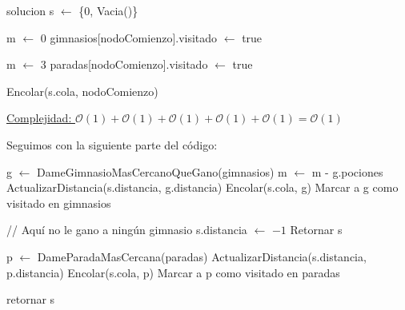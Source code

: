 \begin{algorithm}[H]
\label{}
\begin{algorithmic}[]

\State solucion s $\leftarrow$ \{0, Vacia()\} 

 

	\State m $\leftarrow$ 0  
	\State gimnasios[nodoComienzo].visitado $\leftarrow$ true 
\Else

	\State m $\leftarrow$ 3  
	\State paradas[nodoComienzo].visitado $\leftarrow$ true 

\EndIf

\State Encolar(s.cola, nodoComienzo) 

\medskip
\Statex \underline{Complejidad: $\mathcal{O}(1) + \mathcal{O}(1) + \mathcal{O}(1) + \mathcal{O}(1) + \mathcal{O}(1) = \mathcal{O}(1)$}
\end{algorithmic}
\end{algorithm}


Seguimos con la siguiente parte del código:

\begin{algorithm}[H]
\label{}
\begin{algorithmic}[]


		\State g $\leftarrow$ DameGimnasioMasCercanoQueGano(gimnasios)
		\State m $\leftarrow$ m - g.pociones
		\State ActualizarDistancia(s.distancia, g.distancia)
		\State Encolar(s.cola, g)
		\State Marcar a g como visitado en gimnasios

		\State // Aquí no le gano a ningún gimnasio
		\State s.distancia $\leftarrow$ $-1$
		\State Retornar s
	
	\Else

		\State p $\leftarrow$ DameParadaMasCercana(paradas)
		\State ActualizarDistancia(s.distancia, p.distancia)
		\State Encolar(s.cola, p)
		\State Marcar a p como visitado en paradas

	\EndIf

\EndFor

\State retornar s

\medskip
\Statex \underline{}
\end{algorithmic}
\end{algorithm}


